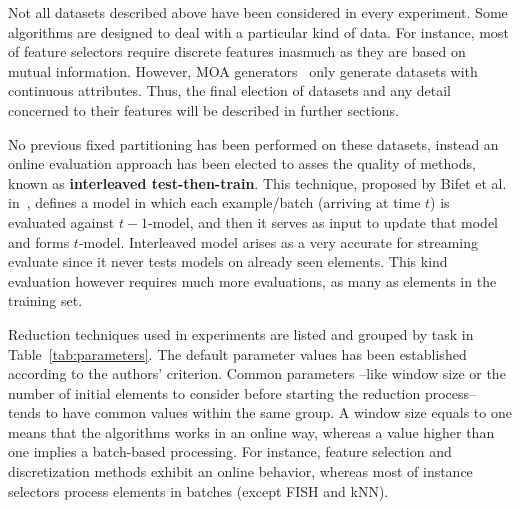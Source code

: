 \documentclass[preprint,12pt]{elsarticle}
\begin{document}
Not all datasets described above have been considered in every experiment. Some algorithms are designed to deal with a particular kind of data. For instance, most of feature selectors require discrete features inasmuch as they are based on mutual information. However, MOA generators~\cite{bifet10} only generate datasets with continuous attributes. Thus, the final election of datasets and any detail concerned to their features will be described in further sections.

No previous fixed partitioning has been performed on these datasets, instead an online evaluation approach has been elected to asses the quality of methods, known as \textbf{interleaved test-then-train}. This technique, proposed by Bifet et al. in~\cite{bifet09}, defines a model in which each example/batch (arriving at time $t$) is evaluated against $t-1$-model, and then it serves as input to update that model and forms $t$-model. Interleaved model arises as a very accurate for streaming evaluate since it never tests models on already seen elements. This kind evaluation however requires much more evaluations, as many as elements in the training set.

Reduction techniques used in experiments are listed and grouped by task in Table~\ref{tab:parameters}. The default parameter values has been established according to the authors' criterion. Common parameters --like window size or the number of initial elements to consider before starting the reduction process-- tends to have common values within the same group. A window size equals to one means that the algorithms works in an online way, whereas a value higher than one implies a batch-based processing. For instance, feature selection and discretization methods exhibit an online behavior, whereas most of instance selectors process elements in batches (except FISH and kNN).
\end{document}

